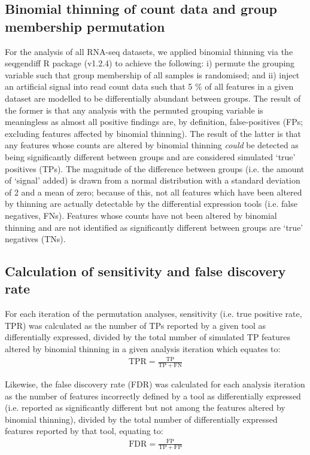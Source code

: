 \documentclass[10pt,letterpaper]{article}
\begin{document}
\subsection*{Binomial thinning of count data and group membership permutation}
For the analysis of all RNA-seq datasets, we applied binomial thinning via the seqgendiff R package (v1.2.4) \cite{gerard_data-based_2020} to achieve the following: i) permute the grouping variable such that group membership of all samples is randomised; and ii) inject an artificial signal into read count data such that 5 \% of all features in a given dataset are modelled to be differentially abundant between groups. The result of the former is that any analysis with the permuted grouping variable is meaningless as almost all positive findings are, by definition, false-positives (FPs; excluding features affected by binomial thinning). The result of the latter is that any features whose counts are altered by binomial thinning \emph{could} be detected as being significantly different between groups and are considered simulated `true' positives (TPs). The magnitude of the difference between groups (i.e. the amount of `signal' added) is drawn from a normal distribution with a standard deviation of 2 and a mean of zero; because of this, not all features which have been altered by thinning are actually detectable by the differential expression tools (i.e. false negatives, FNs). Features whose counts have not been altered by binomial thinning and are not identified as significantly different between groups are `true' negatives (TNs).

\subsection*{Calculation of sensitivity and false discovery rate}
For each iteration of the permutation analyses, sensitivity (i.e. true positive rate, TPR) was calculated as the number of TPs reported by a given tool as differentially expressed, divided by the total number of simulated TP features altered by binomial thinning in a given analysis iteration which equates to:
\begin{eqnarray}
	\label{eq:TPR}
	\mathrm{TPR} = \frac{\mathrm{TP}}{\mathrm{TP} + \mathrm{FN}}
 \end{eqnarray}
 
Likewise, the false discovery rate (FDR) was calculated for each analysis iteration as the number of features incorrectly defined by a tool as differentially expressed (i.e. reported as significantly different but not among the features altered by binomial thinning), divided by the total number of differentially expressed features reported by that tool, equating to: 
\begin{eqnarray}
	\label{eq:FDR}
	\mathrm{FDR} = \frac{\mathrm{FP}}{\mathrm{TP} + \mathrm{FP}}
 \end{eqnarray}
 
\end{document}
